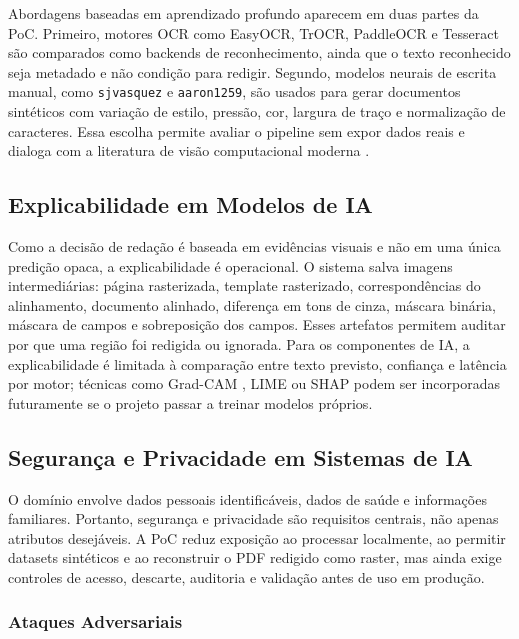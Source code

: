 \documentclass[12pt,a4paper]{article}
\begin{document}
Abordagens baseadas em aprendizado profundo aparecem em duas partes da PoC. Primeiro, motores OCR como EasyOCR, TrOCR, PaddleOCR e Tesseract são comparados como backends de reconhecimento, ainda que o texto reconhecido seja metadado e não condição para redigir. Segundo, modelos neurais de escrita manual, como \texttt{sjvasquez} e \texttt{aaron1259}, são usados para gerar documentos sintéticos com variação de estilo, pressão, cor, largura de traço e normalização de caracteres. Essa escolha permite avaliar o pipeline sem expor dados reais e dialoga com a literatura de visão computacional moderna \cite{goodfellow2016deep,dosovitskiy2020image}.

\subsection{Explicabilidade em Modelos de IA}

Como a decisão de redação é baseada em evidências visuais e não em uma única predição opaca, a explicabilidade é operacional. O sistema salva imagens intermediárias: página rasterizada, template rasterizado, correspondências do alinhamento, documento alinhado, diferença em tons de cinza, máscara binária, máscara de campos e sobreposição dos campos. Esses artefatos permitem auditar por que uma região foi redigida ou ignorada. Para os componentes de IA, a explicabilidade é limitada à comparação entre texto previsto, confiança e latência por motor; técnicas como Grad-CAM \cite{selvaraju2017grad}, LIME \cite{ribeiro2016should} ou SHAP \cite{lundberg2017unified} podem ser incorporadas futuramente se o projeto passar a treinar modelos próprios.

\subsection{Segurança e Privacidade em Sistemas de IA}

O domínio envolve dados pessoais identificáveis, dados de saúde e informações familiares. Portanto, segurança e privacidade são requisitos centrais, não apenas atributos desejáveis. A PoC reduz exposição ao processar localmente, ao permitir datasets sintéticos e ao reconstruir o PDF redigido como raster, mas ainda exige controles de acesso, descarte, auditoria e validação antes de uso em produção.

\subsubsection{Ataques Adversariais}
\end{document}
